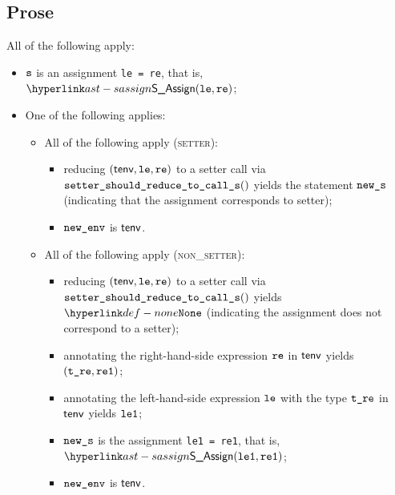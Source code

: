 \subsection{Prose}
All of the following apply:
\begin{itemize}
  \item $\texttt{s}$ is an assignment \texttt{le = re}, that is, $\SAssign(\vle, \vre)$;
  \item One of the following applies:
  \begin{itemize}
    \item All of the following apply (\textsc{setter}):
    \begin{itemize}
      \item reducing $(\textsf{tenv}, \texttt{le}, \texttt{re})$ to a setter call via \\ $\inlinesetter$ yields the statement $\texttt{new\_s}$
      (indicating that the assignment corresponds to setter)\ProseOrTypeError;
      \item $\texttt{new\_env}$ is $\textsf{tenv}$.
    \end{itemize}

    \item All of the following apply (\textsc{non\_setter}):
    \begin{itemize}
      \item reducing $(\textsf{tenv}, \texttt{le}, \texttt{re})$ to a setter call via \\ $\inlinesetter$ yields $\None$
            (indicating the assignment does not correspond to a setter);
      \item annotating the right-hand-side expression $\texttt{re}$ in $\textsf{tenv}$ yields $(\texttt{t\_re}, \texttt{re1})$\ProseOrTypeError;
      \item annotating the left-hand-side expression $\texttt{le}$ with the type $\texttt{t\_re}$ in $\textsf{tenv}$ yields $\texttt{le1}$\ProseOrTypeError;
      \item $\texttt{new\_s}$ is the assignment \texttt{le1 = re1}, that is, $\SAssign(\vleone, \vreone)$;
      \item $\texttt{new\_env}$ is $\textsf{tenv}$.
    \end{itemize}

  \end{itemize}
\end{itemize}



